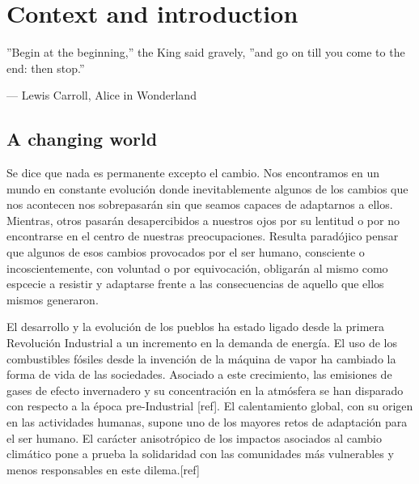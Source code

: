 

\chapter{Context and introduction}

\epigraphfontsize{\small\itshape}
\epigraph{''Begin at the beginning,'' the King said gravely, ''and go on till you
come to the end: then stop.''}{--- \textup{Lewis Carroll}, Alice in Wonderland}

\section{A changing world} 



Se dice que nada es permanente excepto el cambio. Nos encontramos en un mundo en constante evolución donde inevitablemente algunos de los cambios que nos acontecen nos sobrepasarán sin que seamos capaces de adaptarnos a ellos. Mientras, otros pasarán desapercibidos a nuestros ojos por su lentitud o por no encontrarse en el centro de nuestras preocupaciones. Resulta paradójico pensar que algunos de esos cambios provocados por el ser humano, consciente o incoscientemente, con voluntad o por equivocación, obligarán al mismo como espcecie a resistir y adaptarse frente a las consecuencias de aquello que ellos mismos generaron. 

El desarrollo y la evolución de los pueblos ha estado ligado desde la primera Revolución Industrial a un incremento en la demanda de energía. El uso de los combustibles fósiles desde la invención de la máquina de vapor ha cambiado la forma de vida de las sociedades. Asociado a este crecimiento, las emisiones de gases de efecto invernadero y su concentración en la atmósfera se han disparado con respecto a la época pre-Industrial [ref]. El calentamiento global, con su origen en las actividades humanas, supone uno de los mayores retos de adaptación para el ser humano. El carácter anisotrópico de los impactos asociados al cambio climático pone a prueba la solidaridad con las comunidades más vulnerables y menos responsables en este dilema.[ref]

